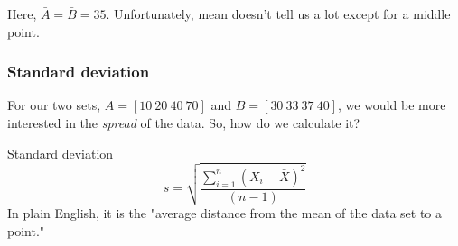 \documentclass{beamer}
\begin{document}
\begin{frame}[fragile]
\begin{center}
        \end{center}
        Here, $\bar{{A}} = \bar{{B}} = 35$. Unfortunately, mean doesn't tell us a lot except for a middle point.
    \end{frame}

    \begin{frame}
        \frametitle{Standard deviation}
        For our two sets, $A = \left[ 10\: 20\: 40\: 70 \right]$ and $B = \left[ 30\: 33\: 37\: 40 \right]$, we would be more interested in the \emph{spread} of the data.
        \bigskip
        So, how do we calculate it?
        \begin{center}    
            \begin{block}{Standard deviation}
                \begin{equation}    %
                    s = \sqrt{\frac{\sum_{i=1}^n (X_i - \bar{X})^2}{(n-1)}}
                \end{equation}
                In plain English, it is the "average distance from the mean of the data set to a point."
            \end{block}
        \end{center}
        
    \end{frame}
\end{document}
